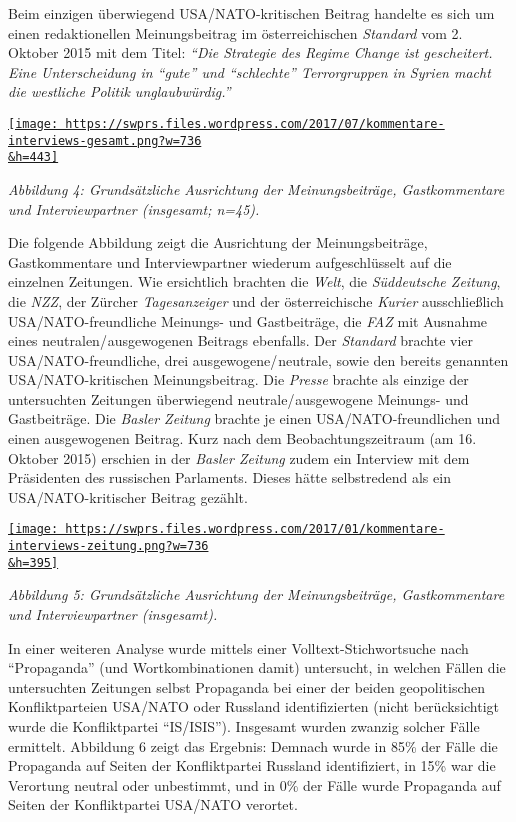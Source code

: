 Beim einzigen überwiegend USA/NATO-kritischen Beitrag handelte es sich
um einen redaktionellen Meinungsbeitrag im österreichischen
\emph{Standard} vom 2. Oktober 2015 mit dem Titel: \emph{``Die Strategie
des Regime Change ist gescheitert. Eine Unterscheidung in ``gute'' und
``schlechte'' Terrorgruppen in Syrien macht die westliche Politik
unglaubwürdig.''}

\href{https://swprs.files.wordpress.com/2017/07/kommentare-interviews-gesamt.png}{\texttt{[image: https://swprs.files.wordpress.com/2017/07/kommentare-interviews-gesamt.png?w=736\\\&h=443]}}

\emph{Abbildung 4: Grundsätzliche Ausrichtung der Meinungs­beiträge,
Gastkommentare und Interview­partner (insgesamt; n=45).}

Die folgende Abbildung zeigt die Ausrichtung der Meinungsbeiträge,
Gastkommentare und Interviewpartner wiederum aufgeschlüsselt auf die
einzelnen Zeitungen. Wie ersichtlich brachten die \emph{Welt}, die
\emph{Süddeutsche Zeitung}, die \emph{NZZ}, der Zürcher
\emph{Tagesanzeiger} und der österreichische \emph{Kurier}
ausschließlich USA/NATO-freundliche Meinungs- und Gastbeiträge, die
\emph{FAZ} mit Ausnahme eines neutralen/ ausgewogenen Beitrags
ebenfalls. Der \emph{Standard} brachte vier USA/NATO-freundliche, drei
ausgewogene/ neutrale, sowie den bereits genannten USA/NATO-kritischen
Meinungsbeitrag. Die \emph{Presse} brachte als einzige der untersuchten
Zeitungen überwiegend neutrale/ ausgewogene Meinungs- und Gastbeiträge.
Die \emph{Basler Zeitung} brachte je einen USA/NATO-freundlichen und
einen ausgewogenen Beitrag. Kurz nach dem Beobachtungszeitraum (am 16.
Oktober 2015) erschien in der \emph{Basler Zeitung} zudem ein Interview
mit dem Präsidenten des russischen Parlaments. Dieses hätte selbstredend
als ein USA/NATO-kritischer Beitrag gezählt.

\href{https://swprs.files.wordpress.com/2017/01/kommentare-interviews-zeitung.png}{\texttt{[image: https://swprs.files.wordpress.com/2017/01/kommentare-interviews-zeitung.png?w=736\\\&h=395]}}

\emph{Abbildung 5: Grundsätzliche Ausrichtung der Meinungsbeiträge,
Gastkommentare und Interviewpartner (insgesamt).}

In einer weiteren Analyse wurde mittels einer Volltext-Stichwortsuche
nach ``Propaganda'' (und Wortkombinationen damit) untersucht, in welchen
Fällen die untersuchten Zeitungen selbst Propaganda bei einer der beiden
geopolitischen Konfliktparteien USA/NATO oder Russland identifizierten
(nicht berücksichtigt wurde die Konfliktpartei ``IS/ISIS''). Insgesamt
wurden zwanzig solcher Fälle ermittelt. Abbildung 6 zeigt das Ergebnis:
Demnach wurde in 85\% der Fälle die Propaganda auf Seiten der
Konfliktpartei Russland identifiziert, in 15\% war die Verortung neutral
oder unbestimmt, und in 0\% der Fälle wurde Propaganda auf Seiten der
Konfliktpartei USA/NATO verortet.


